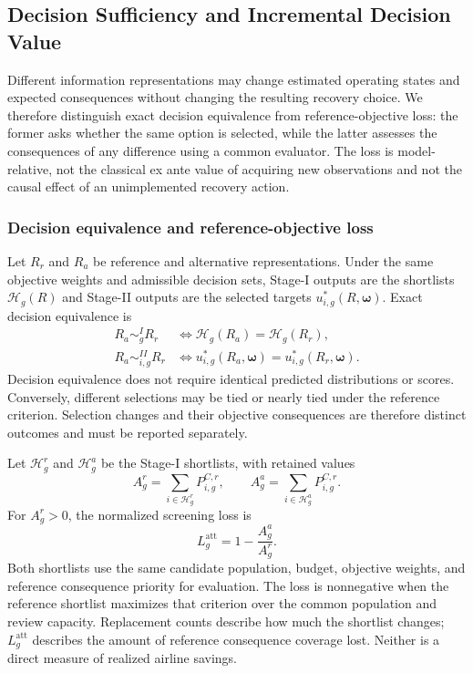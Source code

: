 \subsection{Decision Sufficiency and Incremental Decision Value}
\label{sec:incremental_decision_value}

Different information representations may change estimated operating states and expected consequences without changing the resulting recovery choice. We therefore distinguish exact decision equivalence from reference-objective loss: the former asks whether the same option is selected, while the latter assesses the consequences of any difference using a common evaluator. The loss is model-relative, not the classical ex ante value of acquiring new observations and not the causal effect of an unimplemented recovery action.

\subsubsection{Decision equivalence and reference-objective loss}

Let $R_r$ and $R_a$ be reference and alternative representations. Under the same objective weights and admissible decision sets, Stage-I outputs are the shortlists $\mathcal H_g(R)$ and Stage-II outputs are the selected targets $u^*_{i,g}(R,\boldsymbol\omega)$. Exact decision equivalence is
\begin{equation}
\begin{aligned}
R_a\sim_g^I R_r
&\iff \mathcal H_g(R_a)=\mathcal H_g(R_r),\\
R_a\sim_{i,g}^{II}R_r
&\iff u^*_{i,g}(R_a,\boldsymbol\omega)
=u^*_{i,g}(R_r,\boldsymbol\omega).
\end{aligned}
\label{eq:decision_equivalence}
\end{equation}
Decision equivalence does not require identical predicted distributions or scores. Conversely, different selections may be tied or nearly tied under the reference criterion. Selection changes and their objective consequences are therefore distinct outcomes and must be reported separately.

Let $\mathcal H_g^r$ and $\mathcal H_g^a$ be the Stage-I shortlists, with retained values
\[
A_g^r=\sum_{i\in\mathcal H_g^r}P_{i,g}^{C,r},\qquad
A_g^a=\sum_{i\in\mathcal H_g^a}P_{i,g}^{C,r}.
\]
For $A_g^r>0$, the normalized screening loss is
\[
L_g^{\mathrm{att}}=1-\frac{A_g^a}{A_g^r}.
\]
Both shortlists use the same candidate population, budget, objective weights, and reference consequence priority for evaluation. The loss is nonnegative when the reference shortlist maximizes that criterion over the common population and review capacity. Replacement counts describe how much the shortlist changes; $L_g^{\mathrm{att}}$ describes the amount of reference consequence coverage lost. Neither is a direct measure of realized airline savings.

